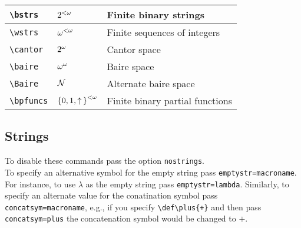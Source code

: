 \documentclass[leqno,11pt]{amsart}
\begin{document}
\begin{tabular}{l |  l | l}\toprule
	\verb=\bstrs=		       & \( 2^{<\omega}  \) & Finite binary strings        \\	\midrule
	\verb=\wstrs=                 & \( \omega^{<\omega}  \) & Finite sequences of integers \\ 	\midrule
	\verb=\cantor=                & \( 2^{\omega} \) & Cantor space		     \\    \midrule
	\verb=\baire=                 & \( \omega^{\omega}  \) & Baire space                  \\[6pt]
	\verb=\Baire=                 & \( \mathcal{N}  \) & Alternate baire space        \\ \midrule
	\verb=\bpfuncs= 							& \( {\lbrace 0,1, \mathpunct{\uparrow} \rbrace}^{< \omega} \) & Finite binary partial functions      \\	
		\bottomrule
	\end{tabular}

\subsection{Strings}
To disable these commands pass the option \verb=nostrings=.\\

To specify an alternative symbol for the empty string pass \verb!emptystr=macroname!.  For instance, to use \( \lambda \) as the empty string pass \verb!emptystr=lambda!.  Similarly, to specify an alternate value for the conatination symbol pass \verb!concatsym=macroname!, e.g., if you specify \verb!\def\plus{+}! and then pass \verb!concatsym=plus! the concatenation symbol would be changed to \( + \).
\end{document}
